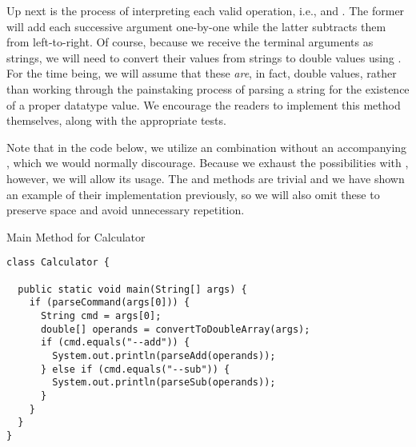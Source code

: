 Up next is the process of interpreting each valid operation, i.e.,  and . The former will add each successive argument one-by-one while the latter subtracts them from left-to-right. Of course, because we receive the terminal arguments as strings, we will need to convert their values from strings to double values using . For the time being, we will assume that these \emph{are}, in fact, double values, rather than working through the painstaking process of parsing a string for the existence of a proper  datatype value. We encourage the readers to implement this method themselves, along with the appropriate tests.

Note that in the code below, we utilize an  combination without an accompanying , which we would normally discourage. Because we exhaust the possibilities with , however, we will allow its usage. The  and  methods are trivial and we have shown an example of their implementation previously, so we will also omit these to preserve space and avoid unnecessary repetition.

\begin{cl}[]{Main Method for Calculator}
\begin{lstlisting}[language=MyJava]
class Calculator {

  public static void main(String[] args) {
    if (parseCommand(args[0])) {
      String cmd = args[0];
      double[] operands = convertToDoubleArray(args);
      if (cmd.equals("--add")) {
        System.out.println(parseAdd(operands));
      } else if (cmd.equals("--sub")) {
        System.out.println(parseSub(operands));
      }
    }
  }
}
\end{lstlisting}
\end{cl}


